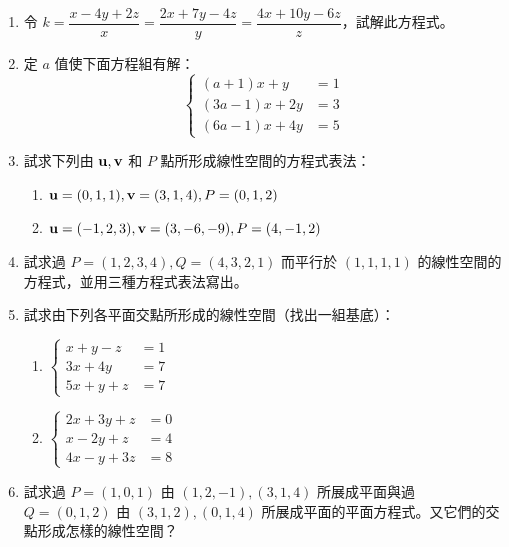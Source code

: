 \begin{enumerate}[label=\arabic*., leftmargin=2em]
  \item 令 $k = \dfrac{x-4y+2z}{x} = \dfrac{2x+7y-4z}{y} = \dfrac{4x+10y-6z}{z}$，試解此方程式。

  \item 定 $a$ 值使下面方程組有解：
  \[ \left\{\begin{aligned}
  (a+1)x + y &= 1 \\
  (3a-1)x + 2y &= 3 \\
  (6a-1)x + 4y &= 5
  \end{aligned}\right. \]

  \item[\textbf{**5.}] 試求下列由 $\boldsymbol{\mathbf{u}}, \boldsymbol{\mathbf{v}}$ 和 $P$ 點所形成線性空間的方程式表法：
  \begin{enumerate}[label=(\roman*)]
    \item $\boldsymbol{\mathbf{u}}=(0, 1, 1), \boldsymbol{\mathbf{v}}=(3, 1, 4), P=(0, 1, 2)$
    \item $\boldsymbol{\mathbf{u}}=(-1, 2, 3), \boldsymbol{\mathbf{v}}=(3, -6, -9), P=(4, -1, 2)$
  \end{enumerate}

  \item[\textbf{*6.}] 試求過 $P=(1, 2, 3, 4), Q=(4, 3, 2, 1)$ 而平行於 $(1, 1, 1, 1)$ 的線性空間的方程式，並用三種方程式表法寫出。

  \item[\textbf{**7.}] 試求由下列各平面交點所形成的線性空間（找出一組基底）：
  \begin{enumerate}[label=(\roman*)]
    \item $\left\{\begin{aligned}
    x+y-z &= 1 \\
    3x+4y &= 7 \\
    5x+y+z &= 7
    \end{aligned}\right.$
    \item $\left\{\begin{aligned}
    2x+3y+z &= 0 \\
    x-2y+z &= 4 \\
    4x-y+3z &= 8
    \end{aligned}\right.$
  \end{enumerate}

  \item[\textbf{**8.}] 試求過 $P=(1, 0, 1)$ 由 $(1, 2, -1), (3, 1, 4)$ 所展成平面與過 $Q=(0, 1, 2)$ 由 $(3, 1, 2), (0, 1, 4)$ 所展成平面的平面方程式。又它們的交點形成怎樣的線性空間？


\end{enumerate}
